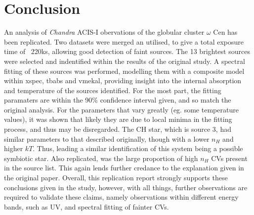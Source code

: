 \documentclass[aps,
                pra,  
                a4paper, 
                amsmath, 
                amssymb, 
                preprint,
                tightenlines,  
                amsfonts,
                nofootinbib,
                notitlepage
            ]{revtex4-2}
\begin{document}
\section{Conclusion}
An analysis of {\it Chandra} ACIS-I obervations of the globular cluster $\omega$ Cen has been replicated. Two datasets were merged an utilised, to give a total exposure time of ~220ks, allowing good detection of faint sources. The 13 brightest sources were selected and indentified within the results of the original study. A spectral fitting of these sources was performed, modelling them with a composite model within {\sc xspec}, {\sc tbabs} and {\sc vmekal}, providing insight into the internal absorption and temperature of the sources identified. For the most part, the fitting paramaters are within the 90\% confidence interval given, and so match the original analysis. For the parameters that vary greatly (eg. some temperature values), it was shown that likely they are due to local minima in the fitting process, and thus may be disregarded. The CH star, which is source 3, had similar parameters to that described originally, though with a lower $n_H$ and higher $kT$. Thus, leading a similar identification of this system being a possible symbiotic star. Also replicated, was the large proportion of high $n_H$ CVs present in the source list. This again lends further credance to the explanation given in the original paper. Overall, this replication report strongly supports these conclusions given in the study, however, with all things, further observations are required to validate these claims, namely observations within different energy bands, such as UV, and spectral fitting of fainter CVs. 

\nocite{*}


\newpage
\appendix
\end{document}
